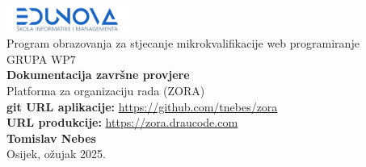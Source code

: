 \documentclass[a4paper,12pt]{article}
\begin{document}
\begin{titlepage}
    \begin{center}
        \includegraphics[width=0.3\textwidth]{edunova_logo.png}\\[2cm]
        {\Large Program obrazovanja za stjecanje mikrokvalifikacije web programiranje}\\[1ex]
        GRUPA WP7\\[4cm]
        {\Huge \textbf{Dokumentacija završne provjere}}\\[2ex]
        {\LARGE Platforma za organizaciju rada (ZORA)}\\[4cm]
        \textbf{git URL aplikacije:} \url{https://github.com/tnebes/zora}\\[1ex]
        \textbf{URL produkcije:} \url{https://zora.draucode.com}\\[4cm]
        {\Huge{\textbf{Tomislav Nebes}}}\\[2cm]
        {\large Osijek, ožujak 2025.}
    \end{center}
\end{titlepage}

\tableofcontents
\newpage
{}


\newpage

\newpage

\newpage

\newpage

\newpage

\newpage

\newpage

\end{document}
